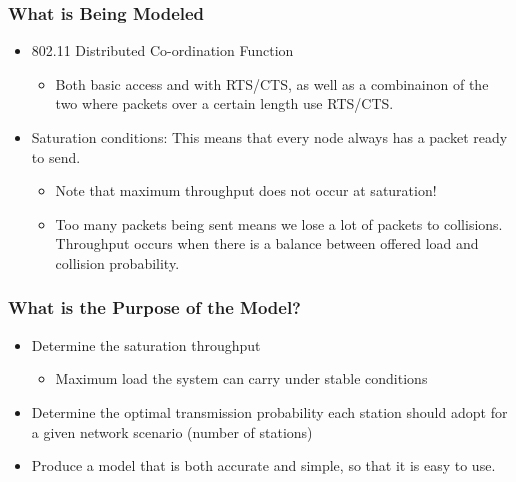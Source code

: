 \subsubsection{What is Being Modeled}\label{subsubsec:Bianchi_Model_What_Modeled}
\begin{itemize}[noitemsep]
\item 802.11 Distributed Co-ordination Function
  \begin{itemize}[noitemsep]
  \item Both basic access and with RTS/CTS, as well as a combinainon of the two where packets over a certain length use RTS/CTS.
  \end{itemize}
\item Saturation conditions: This means that every node always has
  a packet ready to send.
  \begin{itemize}[noitemsep]
  \item Note that maximum throughput does not occur at saturation!
  \item Too many packets being sent means we lose a lot of packets to collisions. Throughput occurs when there is a balance between offered load and collision probability.
  \end{itemize}
\end{itemize}

\subsubsection{What is the Purpose of the Model?}\label{subsubsec:Bianchi_Model_Purpose}
\begin{itemize}[noitemsep]
\item Determine the saturation throughput
  \begin{itemize}[noitemsep]
  \item Maximum load the system can carry under stable
    conditions
  \end{itemize}
\item Determine the optimal transmission probability each station should adopt for a given network scenario (number of stations)
\item Produce a model that is both accurate and simple, so that it
  is easy to use.
\end{itemize}


